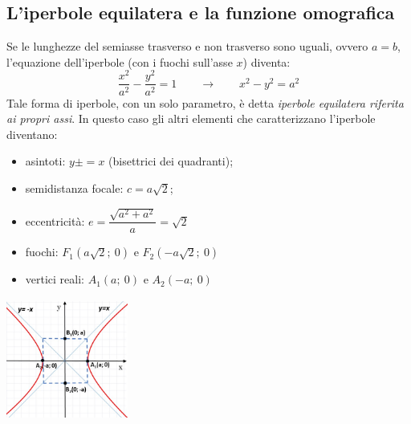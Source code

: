 \subsection{L'iperbole equilatera e la funzione omografica}
\label{subsec:iperbole_omografica}

Se le lunghezze del semiasse trasverso e non trasverso sono uguali, ovvero \(a=b\), 
l'equazione dell'iperbole (con i fuochi sull'asse \(x\)) diventa: 
\begin{equation}
\dfrac{x^{2}}{a^{2}}-\dfrac{y^{2}}{a^{2}}=1 \qquad \longrightarrow \qquad
x^{2}-y^{2} =  a^{2} 
\end{equation}
Tale forma di iperbole, con un solo parametro, è detta 
\emph{iperbole equilatera riferita ai propri assi}. 
In questo caso gli altri elementi che caratterizzano l'iperbole diventano:

\vspace{12pt}
  \noindent\begin{minipage}[c]{.65\textwidth}
  \begin{itemize}
    \item asintoti: \(y\pm=x\) (bisettrici dei quadranti);
    \item semidistanza focale: \(c=a \sqrt{2} \);
    \item eccentricità: \(e = \dfrac{\sqrt{a^{2}+a^{2}}}{a}=\sqrt{2} \)
    \item fuochi: \( F_{1} \left(a \sqrt{2};~0\right)\) e 
                        \( F_{2}\left(-a \sqrt{2};~0\right)\)
    \item vertici reali: \( A_{1}(a;~0)\) e \(A_{2}(-a;~0)\)
  \end{itemize}    
  \end{minipage}
  \hfill
  \begin{minipage}[c]{.3\textwidth}
    \includegraphics[height=4cm, width=4cm,]{img/equilatera.jpg}
  \end{minipage}

